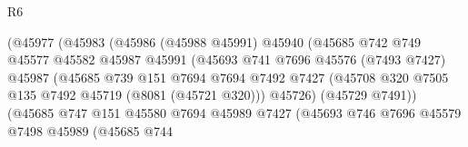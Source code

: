 \begin{lexlean}{R6}
\begin{coremodule}
                                    (@45977
                                      (@45983
                                        (@45986
                                          (@45988 @45991)
                                          @45940
                                          (@45685
                                            @742
                                            @749
                                            @45577
                                            @45582
                                            @45987
                                            @45991
                                            (@45693
                                              @741
                                              @7696
                                              @45576
                                              (@7493 @7427)
                                              @45987
                                              (@45685
                                                @739
                                                @151
                                                @7694
                                                @7694
                                                @7492
                                                @7427
                                                (@45708
                                                  @320
                                                  @7505
                                                  @135
                                                  @7492
                                                  @45719
                                                  (@8081 (@45721 @320)))
                                                @45726)
                                              (@45729 @7491))
                                            (@45685
                                              @747
                                              @151
                                              @45580
                                              @7694
                                              @45989
                                              @7427
                                              (@45693
                                                @746
                                                @7696
                                                @45579
                                                @7498
                                                @45989
                                                (@45685
                                                  @744

\end{coremodule}
\end{lexlean}
